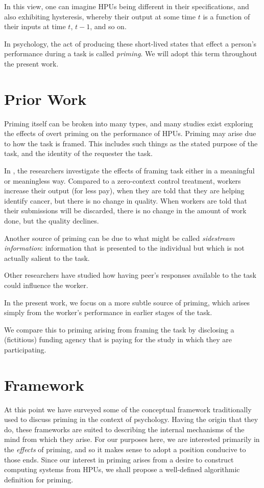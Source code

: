 \documentclass[letterpaper, 11pt, twocolumn]{article}
\begin{document}
In this view, one can imagine HPUs being different in their specifications,
and also exhibiting hysteresis, whereby their output at some time $t$ is a
function of their inputs at time $t$, $t-1$, and so on.

In psychology, the act of producing these short-lived states that effect a
person's performance during a task is called \textit{priming}.  We will adopt
this term throughout the present work.


\section*{Prior Work}
Priming itself can be broken into many types, and many studies exist exploring
the effects of overt priming on the performance of HPUs. Priming may arise
due to how the task is framed.  This includes such things as the stated
purpose of the task, and the identity of the requester the task.

In \cite{chandler2013breaking}, the researchers investigate the effects of 
framing task either in a meaningful or meaningless way.  Compared to a 
zero-context control treatment, workers increase their output (for less pay),
when they are told that they are helping identify cancer, but there is no
change in quality.  When workers are told that their submissions will be 
discarded, there is no change in the amount of work done, but the quality 
declines.

Another source of priming can be due to what might be called 
\textit{sidestream information}: information that is presented to the 
individual but which is not actually salient to the task.

Other researchers have studied how having peer's responses available to 
the task could influence the worker.

In the present work, we focus on a more subtle source of priming, which arises
simply from the worker's performance in earlier stages of the task. 

We compare this to priming arising from framing the task by disclosing a 
(fictitious) funding agency that is paying for the study in which they are 
participating.

\section*{Framework}
At this point we have surveyed some of the conceptual framework traditionally
used to discuss priming in the context of psychology.  Having the origin that
they do, these frameworks are suited to describing the internal mechanisms of
the mind from which they arise.  For our purposes here, we are interested 
primarily in the \textit{effects} of priming, and so it makes sense to 
adopt a position conducive to those ends.  Since our interest in priming 
arises from a desire to construct computing systems from HPUs, we shall
propose a well-defined algorithmic definition for priming.
\end{document}
